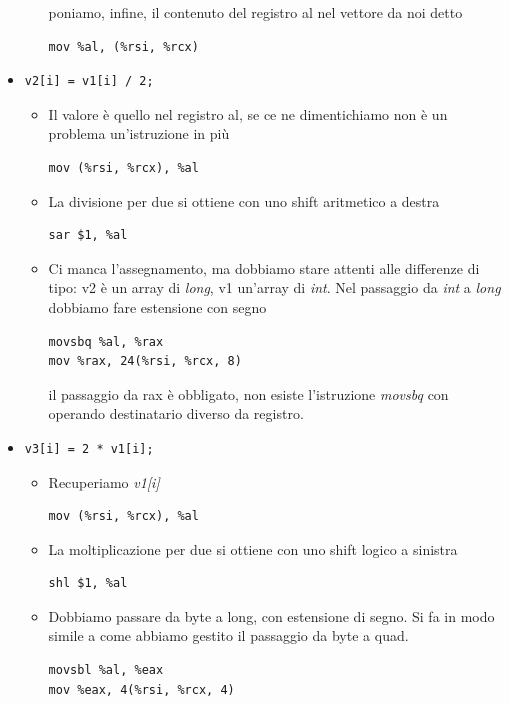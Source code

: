 \documentclass[11pt]{report}
\theoremstyle{definition}
\begin{document}
\begin{itemize}
\begin{itemize}
poniamo, infine, il contenuto del registro al nel vettore da noi detto
\begin{verbatim}
mov %al, (%rsi, %rcx)
\end{verbatim}
\end{itemize}
\item \begin{verbatim}v2[i] = v1[i] / 2;\end{verbatim}
\begin{itemize}
\item Il valore è quello nel registro al, se ce ne dimentichiamo non è un problema un'istruzione in più
\begin{verbatim}
mov (%rsi, %rcx), %al
\end{verbatim}
\item La divisione per due si ottiene con uno shift aritmetico a destra
\begin{verbatim}
sar $1, %al
\end{verbatim}
\item Ci manca l'assegnamento, ma dobbiamo stare attenti alle differenze di tipo: v2 è un array di \emph{long}, v1 un'array di \emph{int}.  Nel passaggio da \emph{int} a \emph{long} dobbiamo fare estensione con segno
\begin{verbatim}
movsbq %al, %rax
mov %rax, 24(%rsi, %rcx, 8)
\end{verbatim}
il passaggio da rax è obbligato, non esiste l'istruzione \emph{movsbq} con operando destinatario diverso da registro.
\end{itemize}
\item \begin{verbatim}v3[i] = 2 * v1[i];\end{verbatim}
\begin{itemize}
\item Recuperiamo \emph{v1[i]}
\begin{verbatim}
mov (%rsi, %rcx), %al
\end{verbatim}
\item La moltiplicazione per due si ottiene con uno shift logico a sinistra
\begin{verbatim}
shl $1, %al
\end{verbatim} 
\item Dobbiamo passare da byte a long, con estensione di segno. Si fa in modo simile a come abbiamo gestito il passaggio da byte a quad.
\begin{verbatim}
movsbl %al, %eax
mov %eax, 4(%rsi, %rcx, 4)
\end{verbatim}

\end{itemize}
\end{itemize}
\end{document}
